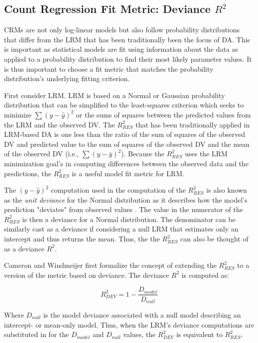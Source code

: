 \documentclass[ShortAfour,times,sageapa]{sagej}
\begin{document}
	\subsection{Count Regression Fit Metric: Deviance $R^2$}
	
	CRMs are not only log-linear models but also follow probability distributions that differ from the LRM that has been traditionally been the focus of DA.
	This is important as statistical models are fit using information about the data as applied to a probability distribution to find their most likely parameter values.
	It is thus important to choose a fit metric that matches the probability distribution's underlying fitting criterion.
	
	First consider LRM.
	LRM is based on a Normal or Gaussian probability distribution that can be simplified to the	least-squares criterion which seeks to minimize $\sum (y - \hat{y})^2$ or the sums of squares between the predicted values from the LRM and the observed DV.
	The $R^2_{RES}$ that has been traditionally applied in LRM-based DA is one less than the ratio of the sum of squares of the observed DV and predicted value to the sum of squares of the observed DV and the mean of the observed DV (i.e., $\sum (y - \bar{y})^2$).
	Because the $R^2_{RES}$ uses the LRM minimization goal's in computing differences between the observed data and the predictions, the $R^2_{RES}$ is a useful model fit metric for LRM.
	
	The $(y - \hat{y})^2$ computation used in the computation of the $R^2_{RES}$ is also known as the \emph{unit deviance} for the Normal distribution as it describes how the model's prediction "deviates" from observed values \cite{mccullagh2019generalized}.
	The value in the numerator of the $R^2_{RES}$ is then a deviance for a Normal distribution.
	The denominator can be similarly cast as a deviance if considering a null LRM that estimates only an intercept and thus returns the mean.
	Thus, the the $R^2_{RES}$ can also be thought of as a deviance $R^2$.
	
	Cameron and Windmeijer \citeyear{cameron1996r} first formalize the concept of extending the $R^2_{RES}$ to a version of the metric based on deviance.
	The deviance $R^2$ is computed as:
	
	\begin{equation}
		R^{2}_{DEV} = 1 - \frac{D_{model}}{D_{null}}
	\end{equation}

	Where $D_{null}$ is the model deviance associated with a null model describing an intercept- or mean-only model.
	Thus, when the LRM's deviance computations are substituted in for the $D_{model}$ and $D_{null}$ values, the $R^{2}_{DEV}$ is equivalent to $R^{2}_{RES}$.
	
\end{document}
